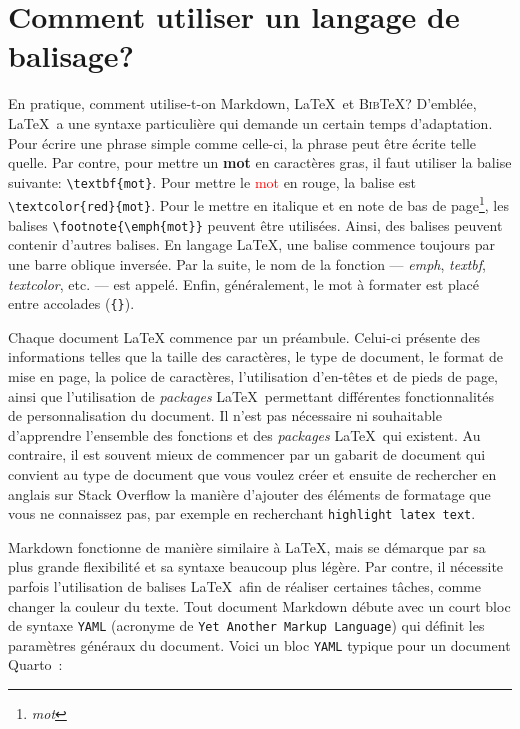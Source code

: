 \documentclass[
  letterpaper,
]{scrbook}
\begin{document}
\hypertarget{comment-utiliser-un-langage-de-balisage}{%
\section{Comment utiliser un langage de
balisage?}\label{comment-utiliser-un-langage-de-balisage}}

En pratique, comment utilise-t-on Markdown, \LaTeX~et \textsc{Bib}\TeX?
D'emblée, \LaTeX~a une syntaxe particulière qui demande un certain temps
d'adaptation. Pour écrire une phrase simple comme celle-ci, la phrase
peut être écrite telle quelle. Par contre, pour mettre un \textbf{mot}
en caractères gras, il faut utiliser la balise suivante:
\texttt{\textbackslash{}textbf\{mot\}}. Pour mettre le
\textcolor{red}{mot} en rouge, la balise est
\texttt{\textbackslash{}textcolor\{red\}\{mot\}}. Pour le mettre en
italique et en note de bas de page\footnote{\emph{mot}}, les balises
\texttt{\textbackslash{}footnote\{\textbackslash{}emph\{mot\}\}} peuvent
être utilisées. Ainsi, des balises peuvent contenir d'autres balises. En
langage \LaTeX, une balise commence toujours par une barre oblique
inversée. Par la suite, le nom de la fonction --- \emph{emph},
\emph{textbf}, \emph{textcolor}, etc. --- est appelé. Enfin,
généralement, le mot à formater est placé entre accolades
(\texttt{\{\}}).

Chaque document \LaTeX{} commence par un préambule. Celui-ci présente
des informations telles que la taille des caractères, le type de
document, le format de mise en page, la police de caractères,
l'utilisation d'en-têtes et de pieds de page, ainsi que l'utilisation de
\emph{packages} \LaTeX~permettant différentes fonctionnalités de
personnalisation du document. Il n'est pas nécessaire ni souhaitable
d'apprendre l'ensemble des fonctions et des \emph{packages} \LaTeX~qui
existent. Au contraire, il est souvent mieux de commencer par un gabarit
de document qui convient au type de document que vous voulez créer et
ensuite de rechercher en anglais sur Stack Overflow la manière d'ajouter
des éléments de formatage que vous ne connaissez pas, par exemple en
recherchant \texttt{highlight\ latex\ text}.

Markdown fonctionne de manière similaire à \LaTeX, mais se démarque par
sa plus grande flexibilité et sa syntaxe beaucoup plus légère. Par
contre, il nécessite parfois l'utilisation de balises \LaTeX~afin de
réaliser certaines tâches, comme changer la couleur du texte. Tout
document Markdown débute avec un court bloc de syntaxe \texttt{YAML}
(acronyme de \texttt{Yet\ Another\ Markup\ Language}) qui définit les
paramètres généraux du document. Voici un bloc \texttt{YAML} typique
pour un document Quarto~:
\end{document}
